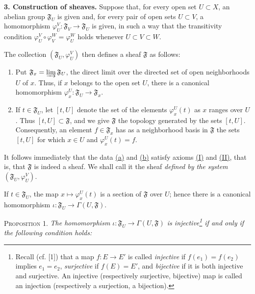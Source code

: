 
\medskip
{}\label{fac:I:1:no:3}
\textbf{3. Construction of sheaves.} Suppose that, for every open set $U\subset X$, an abelian group $\mathfrak{F}_U$ is given and, for every pair of open sets $U\subset V$, a homomorphism $\varphi_U^V:\mathfrak{F}_V\to\mathfrak{F}_U$ is given, in such a way that the transitivity condition $\varphi_U^V\circ\varphi_V^W=\varphi_U^W$ holds whenever $U\subset V\subset W$.

The collection $(\mathfrak{F}_U,\varphi_U^V)$ then defines a sheaf $\mathfrak{F}$ as follows:

\begin{enumerate}[label=(\alph*),leftmargin=2.5em]
\item\label{fac:I:1:no:3:item:a} Put $\mathfrak{F}_x=\varinjlim\mathfrak{F}_U$, the direct limit over the directed set of open neighborhoods $U$ of $x$. Thus, if $x$ belongs to the open set $U$, there is a canonical homomorphism $\varphi_x^U:\mathfrak{F}_U\to\mathfrak{F}_x$.

\item\label{fac:I:1:no:3:item:b} If $t\in\mathfrak{F}_U$, let $[t,U]$ denote the set of the elements $\varphi_x^U(t)$ as $x$ ranges over $U$. Thus $[t,U]\subset\mathfrak{F}$, and we give $\mathfrak{F}$ the topology generated by the sets $[t,U]$. Consequently, an element $f\in\mathfrak{F}_x$ has as a neighborhood basis in $\mathfrak{F}$ the sets $[t,U]$ for which $x\in U$ and $\varphi_x^U(t)=f$.
\end{enumerate}

It follows immediately that the data \hyperref[fac:I:1:no:3:item:a]{(a)} and \hyperref[fac:I:1:no:3:item:b]{(b)} satisfy axioms \hyperref[fac:I:1:no:1:axiom:I]{(I)} and \hyperref[fac:I:1:no:1:axiom:II]{(II)}, that is, that $\mathfrak{F}$ is indeed a sheaf. We shall call it the sheaf \textit{defined by the system} $(\mathfrak{F}_U,\varphi_U^V)$.

If $t\in\mathfrak{F}_U$, the map $x\mapsto\varphi_x^U(t)$ is a section of $\mathfrak{F}$ over $U$; hence there is a canonical homomorphism $\iota:\mathfrak{F}_U\to\Gamma(U,\mathfrak{F})$.

\medskip
{}\label{fac:I:1:no:3:prop:1}
\textsc{Proposition 1.} \textit{The homomorphism $\iota:\mathfrak{F}_U\to\Gamma(U,\mathfrak{F})$ is injective\footnote{Recall (cf. [1]) that a map $f:E\to E'$ is called \textit{injective} if $f(e_1)=f(e_2)$ implies $e_1=e_2$, \textit{surjective} if $f(E)=E'$, and \textit{bijective} if it is both injective and surjective. An injective (respectively surjective, bijective) map is called an injection (respectively a surjection, a bijection).\label{fac:footnote:inj-surj}} if and only if the following condition holds:}

